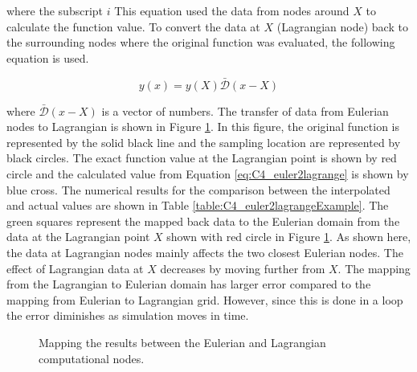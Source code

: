 where the subscript $i$ This equation used the data from nodes around $X$ to calculate the function value. To convert the data at $X$ (Lagrangian node) back to the surrounding nodes where the original function was evaluated, the following equation is used.

\begin{equation}
	y(x) = y(X) \bar{\mathcal{D}}(x - X)
\end{equation}

where $\bar{\mathcal{D}}(x - X)$ is a vector of numbers. The transfer of data from Eulerian nodes to Lagrangian is shown in Figure \ref{fig:C4_euler2lagrangeExample}. In this figure, the original function is represented by the solid black line and the sampling location are represented by black circles. The exact function value at the Lagrangian point is shown by red circle and the calculated value from Equation \eqref{eq:C4_euler2lagrange} is shown by blue cross. The numerical results for the comparison between the interpolated and actual values are shown in Table \ref{table:C4_euler2lagrangeExample}. The green squares represent the mapped back data to the Eulerian domain from the data at the Lagrangian point $X$ shown with red circle in Figure \ref{fig:C4_euler2lagrangeExample}. As shown here, the data at Lagrangian nodes mainly affects the two closest Eulerian nodes. The effect of Lagrangian data at $X$ decreases by moving further from $X$. The mapping from the Lagrangian to Eulerian domain has larger error compared to the mapping from Eulerian to Lagrangian grid. However, since this is done in a loop the error diminishes as simulation moves in time.

\begin{figure}[H]
	\centering
	\quad
	\caption{Mapping the results between the Eulerian and Lagrangian computational nodes.}
	\label{fig:C4_euler2lagrangeExample}
\end{figure}

